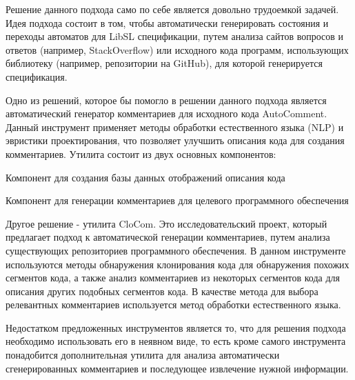 Решение данного подхода само по себе является довольно трудоемкой задачей. Идея подхода состоит в том, чтобы автоматически генерировать  состояния и переходы автоматов для LibSL спецификации, путем анализа сайтов вопросов и ответов (например, StackOverflow) или исходного кода программ, использующих библиотеку (например, репозитории на GitHub), для которой генерируется спецификация.

Одно из решений, которое бы помогло в решении данного подхода является автоматический генератор комментариев для исходного кода AutoComment.
Данный инструмент применяет методы обработки естественного языка (NLP) и эвристики проектирования, что позволяет улучшить описания кода для создания комментариев.
Утилита состоит из двух основных компонентов:
%
\begin{itemize*}
\item Компонент для создания базы данных отображений описания кода
\item Компонент для генерации комментариев для целевого программного обеспечения
\end{itemize*}
%

Другое решение - утилита CloCom. Это исследовательский проект, который предлагает подход к автоматической генерации комментариев, путем анализа существующих репозиториев программного обеспечения.
В данном инструменте используются методы обнаружения клонирования кода для обнаружения похожих сегментов кода, а также анализ комментариев из некоторых сегментов кода для описания других подобных сегментов кода.
В качестве метода для выбора релевантных комментариев используется метод обработки естественного языка.

Недостатком предложенных инструментов является то, что для решения подхода необходимо использовать его в неявном виде, то есть кроме самого инструмента понадобится дополнительная утилита для анализа автоматически сгенерированных комментариев и последующее извлечение нужной информации.

